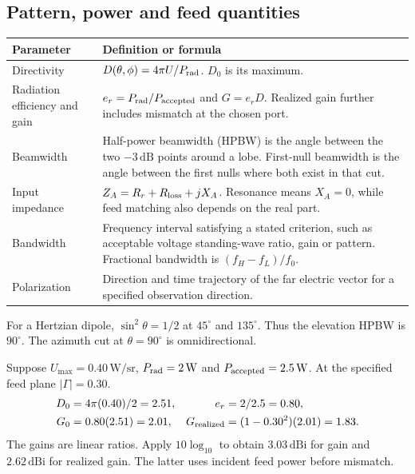 \documentclass[12pt,a4paper]{article}
\begin{document}
\subsection{Pattern, power and feed quantities}
\par\vspace{6pt}\noindent
\begin{tabularx}{\linewidth}{|B{3.9cm}|Y|}\hline
Parameter & Definition or formula \\ \hline
Directivity & $D(\theta,\phi)=4\pi U/P_{\rm rad}$. $D_0$ is its maximum. \\ \hline
Radiation efficiency and gain & $e_r=P_{\rm rad}/P_{\rm accepted}$ and $G=e_rD$. Realized gain further includes mismatch at the chosen port. \\ \hline
Beamwidth & Half-power beamwidth (HPBW) is the angle between the two $-3\,\mathrm{dB}$ points around a lobe. First-null beamwidth is the angle between the first nulls where both exist in that cut. \\ \hline
Input impedance & $Z_A=R_r+R_{\rm loss}+jX_A$. Resonance means $X_A=0$, while feed matching also depends on the real part. \\ \hline
Bandwidth & Frequency interval satisfying a stated criterion, such as acceptable voltage standing-wave ratio, gain or pattern. Fractional bandwidth is $(f_H-f_L)/f_0$. \\ \hline
Polarization & Direction and time trajectory of the far electric vector for a specified observation direction. \\ \hline
\end{tabularx}

For a Hertzian dipole, $\sin^2\theta=1/2$ at $45^\circ$ and $135^\circ$. Thus the elevation HPBW is $90^\circ$. The azimuth cut at $\theta=90^\circ$ is omnidirectional.
\begin{tcolorbox}[examplebox,title={Separate directivity, gain and realized gain}]
Suppose $U_{\max}=0.40\,\mathrm{W/sr}$, $P_{\rm rad}=2\,\mathrm W$ and $P_{\rm accepted}=2.5\,\mathrm W$. At the specified feed plane $|\Gamma|=0.30$.
\[
\begin{aligned}
D_0&=4\pi(0.40)/2=2.51,& e_r&=2/2.5=0.80,\\
G_0&=0.80(2.51)=2.01,& G_{\rm realized}&=(1-0.30^2)(2.01)=1.83 .
\end{aligned}
\]
The gains are linear ratios. Apply $10\log_{10}$ to obtain $3.03\,\mathrm{dBi}$ for gain and $2.62\,\mathrm{dBi}$ for realized gain. The latter uses incident feed power before mismatch.
\end{tcolorbox}
\end{document}
